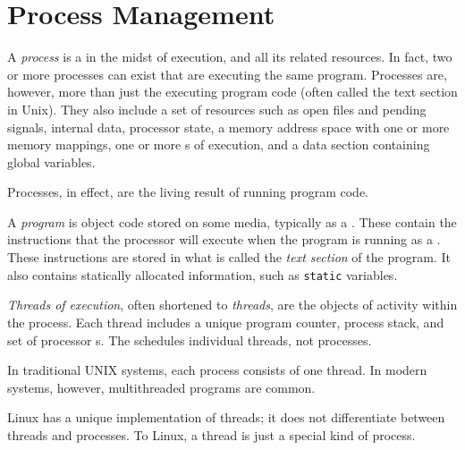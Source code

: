 \section{Process Management}\label{sec:Process_Management}
\begin{definition}[Process]\label{def:Process}
  A \emph{process} is a  in the midst of execution, and all its related resources.
  In fact, two or more processes can exist that are executing the same program.
  Processes are, however, more than just the executing program code (often called the text section in Unix).
  They also include a set of resources such as open files and pending signals, internal  data, processor state, a memory address space with one or more memory mappings, one or more s of execution, and a data section containing global variables.

  Processes, in effect, are the living result of running program code.
\end{definition}

\begin{definition}[Program]\label{def:Program}
  A \emph{program} is object code stored on some media, typically as a .
  These contain the instructions that the processor will execute when the program is running as a .
  These instructions are stored in what is called the \emph{text section} of the program.
  It also contains statically allocated information, such as \texttt{static} variables.
\end{definition}

\begin{definition}[Thread]\label{def:Thread}
  \emph{Threads of execution}, often shortened to \emph{threads}, are the objects of activity within the process.
  Each thread includes a unique program counter, process stack, and set of processor s.
  The  schedules individual threads, not processes.

  In traditional UNIX systems, each process consists of one thread.
  In modern systems, however, multithreaded programs are common.

  \begin{remark}\label{rmk:Linux_Threads}
    Linux has a unique implementation of threads; it does not differentiate between threads and processes.
    To Linux, a thread is just a special kind of process.
  \end{remark}
\end{definition}

